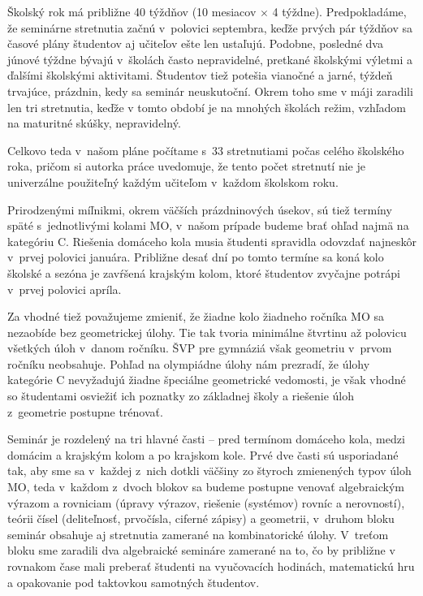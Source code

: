 Školský rok má približne 40 týždňov (10 mesiacov $\times$ 4 týždne). Predpokladáme, že seminárne stretnutia začnú v~polovici septembra, keďže prvých pár týždňov sa časové plány študentov aj učiteľov ešte len ustaľujú. Podobne, posledné dva júnové týždne bývajú v~školách často nepravidelné, pretkané školskými výletmi a ďalšími školskými aktivitami. Študentov tiež potešia vianočné a jarné, týždeň trvajúce, prázdnin, kedy sa seminár neuskutoční. Okrem toho sme v máji zaradili len tri stretnutia, keďže v tomto období je na mnohých školách režim, vzhľadom na maturitné skúšky, nepravidelný.

Celkovo teda v~našom pláne počítame s~33 stretnutiami počas celého školského roka, pričom si autorka práce uvedomuje, že tento počet stretnutí nie je univerzálne použiteľný každým učiteľom v~každom školskom roku.

Prirodzenými míľnikmi, okrem väčších prázdninových úsekov, sú tiež termíny späté s~jednotlivými kolami MO, v~našom prípade budeme brať ohľad najmä na kategóriu C. Riešenia domáceho kola musia študenti spravidla odovzdať najneskôr v~prvej polovici januára. Približne desať dní po tomto termíne sa koná kolo školské a sezóna je zavŕšená krajským kolom, ktoré študentov zvyčajne potrápi v~prvej polovici apríla.

Za vhodné tiež považujeme zmieniť, že žiadne kolo žiadneho ročníka MO sa nezaobíde bez geometrickej úlohy. Tie tak tvoria minimálne štvrtinu až polovicu všetkých úloh v~danom ročníku. ŠVP pre gymnáziá však geometriu v~prvom ročníku neobsahuje. Pohľad na olympiádne úlohy nám prezradí, že úlohy kategórie C nevyžadujú žiadne špeciálne geometrické vedomosti, je však vhodné so študentami osviežiť ich poznatky zo základnej školy a riešenie úloh z~geometrie postupne trénovať.

Seminár je rozdelený na tri hlavné časti -- pred termínom domáceho kola, medzi domácim a krajským kolom a po krajskom kole. Prvé dve časti sú usporiadané tak, aby sme sa v~každej z~nich dotkli väčšiny zo štyroch zmienených typov úloh MO, teda v~každom z~dvoch blokov sa budeme postupne venovať algebraickým výrazom a rovniciam (úpravy výrazov, riešenie (systémov) rovníc a nerovností), teórii čísel (deliteľnosť, prvočísla, ciferné zápisy) a geometrii, v~druhom bloku seminár obsahuje aj stretnutia zamerané na kombinatorické úlohy. V~treťom bloku sme zaradili dva algebraické semináre zamerané na to, čo by približne v rovnakom čase mali preberať študenti na vyučovacích hodinách, matematickú hru a opakovanie pod taktovkou samotných študentov.

